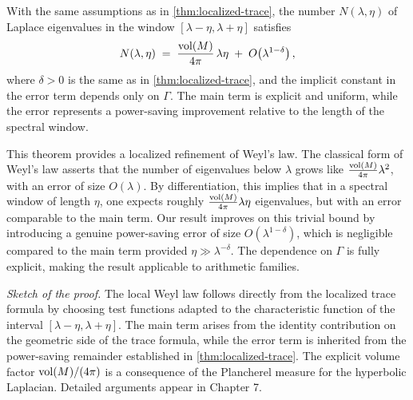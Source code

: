 \begin{theorem}\label{thm:local-weyl}
With the same assumptions as in \cref{thm:localized-trace}, the number
$N(\lambda,\eta)$ of Laplace eigenvalues in the window
$[\lambda-\eta,\lambda+\eta]$ satisfies
\[
  N(\lambda,\eta)
  \;=\; \frac{\operatorname{vol}(M)}{4\pi}\,\lambda\eta
  \;+\; O\!\left(\lambda^{1-\delta}\right),
\]
where $\delta>0$ is the same as in \cref{thm:localized-trace}, and the implicit
constant in the error term depends only on $\Gamma$. The main term is explicit
and uniform, while the error represents a power-saving improvement relative to
the length of the spectral window.
\end{theorem}

This theorem provides a localized refinement of Weyl’s law. The classical form
of Weyl’s law asserts that the number of eigenvalues below $\lambda$ grows like
$\frac{\operatorname{vol}(M)}{4\pi}\lambda^2$, with an error of size $O(\lambda)$. By
differentiation, this implies that in a spectral window of length $\eta$, one
expects roughly $\frac{\operatorname{vol}(M)}{4\pi}\lambda\eta$ eigenvalues, but with an
error comparable to the main term. Our result improves on this trivial bound by
introducing a genuine power-saving error of size $O(\lambda^{1-\delta})$, which
is negligible compared to the main term provided $\eta\gg \lambda^{-\delta}$.
The dependence on $\Gamma$ is fully explicit, making the result applicable to
arithmetic families.

\medskip

\noindent \textit{Sketch of the proof.}
The local Weyl law follows directly from the localized trace formula by
choosing test functions adapted to the characteristic function of the interval
$[\lambda-\eta,\lambda+\eta]$. The main term arises from the identity
contribution on the geometric side of the trace formula, while the error term
is inherited from the power-saving remainder established in
\cref{thm:localized-trace}. The explicit volume factor $\operatorname{vol}(M)/(4\pi)$ is a
consequence of the Plancherel measure for the hyperbolic Laplacian. Detailed
arguments appear in Chapter 7.


\medskip

